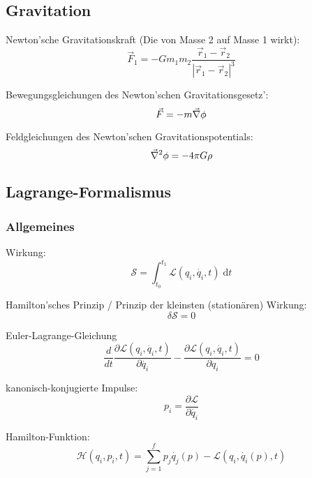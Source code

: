	\subsection{Gravitation}
		\noindent
		Newton'sche Gravitationskraft (Die von Masse 2 auf Masse 1 wirkt):
		\begin{equation}
			\vec{F}_1 = - G m_1 m_2 \frac{\vec{r}_1-\vec{r}_2}{\left|\vec{r}_1-\vec{r}_2\right|^3}
		\end{equation}

		\noindent
		Bewegungsgleichungen des Newton'schen Gravitationsgesetz':
		\begin{equation}
			\vec{F}=-m\vec{\nabla}\phi
		\end{equation}

		\noindent
		Feldgleichungen des Newton'schen Gravitationspotentials:
		\begin{equation}
			\vec{\nabla}^2\phi=-4\pi G\rho
		\end{equation}

	\subsection{Lagrange-Formalismus}
		\subsubsection{Allgemeines}
			\noindent
			Wirkung:
			\begin{equation}
				\mathcal{S}=\int_{t_0}^{t_1}\mathcal{L}(q_i, \dot{q_i},t)\;\mathrm{d} t
			\end{equation}

			\noindent
			Hamilton'sches Prinzip / Prinzip der kleinsten (stationären) Wirkung:
			\begin{equation}
				\delta \mathcal{S}=0
			\end{equation}

			\noindent
			Euler-Lagrange-Gleichung
			\begin{equation}
				 \frac{d}{dt} \frac{\partial \mathcal{L}(q_{i},\dot{q_{i}},t)}{\partial \dot{q_{i}}} - \frac{\partial \mathcal{L}(q_{i},\dot{q_{i}},t)}{\partial q_{i}} = 0
			\end{equation}

			\noindent
			kanonisch-konjugierte Impulse:
			\begin{equation}
				p_i=\frac{\partial \mathcal{L}}{\partial\dot{q_i}}
			\end{equation}

			\noindent
			Hamilton-Funktion:
			\begin{equation}
				\mathcal{H}(q_i,p_i,t)=\sum_{j=1}^{f}p_j\dot{q_j}(p) - \mathcal{L}(q_i, \dot{q_i}(p),t)
			\end{equation}


